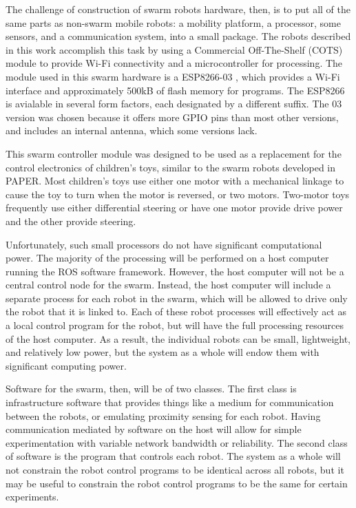 \documentclass[]{article}
\begin{document}
The challenge of construction of swarm robots hardware, then, is to put all of the same parts as non-swarm mobile robots: a mobility platform, a processor, some sensors, and a communication system, into a small package.  
The robots described in this work accomplish this task by using a Commercial Off-The-Shelf (COTS) module to provide Wi-Fi connectivity and a microcontroller for processing. 
The module used in this swarm hardware is a ESP8266-03  , which provides a Wi-Fi interface and approximately 500kB of flash memory for programs. 
The ESP8266 is avialable in several form factors, each designated by a different suffix. 
The 03 version was chosen because it offers more GPIO pins than most other versions, and includes an internal antenna, which some versions lack. 

This swarm controller module was designed to be used as a replacement for the control electronics of children's toys, similar to the  swarm robots developed in PAPER. 
Most children's toys use either one motor with a mechanical linkage to cause the toy to turn when the motor is reversed, or two motors.
Two-motor toys frequently use either differential steering or have one motor provide drive power and the other provide steering. 

Unfortunately, such small processors do not have significant computational power. 
The majority of the processing will be performed on a host computer running the ROS software framework. 
However, the host computer will not be a central control node for the swarm. 
Instead, the host computer will include a separate process for each robot in the swarm, which will be allowed to drive only the robot that it is linked to. 
Each of these robot processes will effectively act as a local control program for the robot, but will have the full processing resources of the host computer. 
As a result, the individual robots can be small, lightweight, and relatively low power, but the system as a whole will endow them with significant computing power. 

Software for the swarm, then, will be of two classes. 
The first class is infrastructure software that provides things like a medium for communication between the robots, or emulating proximity sensing for each robot. 
Having communication mediated by software on the host will allow for simple experimentation with variable network bandwidth or reliability. 
The second class of software is the program that controls each robot. 
The system as a whole will not constrain the robot control programs to be identical across all robots, but it may be useful to constrain the robot control programs to be the same for certain experiments. 
\end{document}
